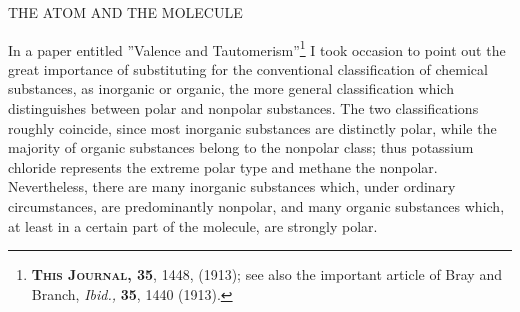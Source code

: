 \documentclass[11pt]{memoir}
\begin{document}
\setlength{\aboverulesep}{0pt} %
\setlength{\belowrulesep}{0pt}
  
\titleformat{\section}{\normalfont\Large\scshape\centering}{\thesection}{}{}
\titleformat{\subsection}{\normalfont\bfseries}{\thesubsection}{}{}



\frontmatter

\mainmatter
{}


\thispagestyle{plain}

\begin{center}
	{\LARGE THE ATOM AND THE MOLECULE}
\end{center}


 
In a paper entitled ''Valence and Tautomerism''\footnote{\textbf{\textsc{This Journal}, 35}, 1448, (1913); see also the important article of Bray and Branch, \emph{Ibid.,} \textbf{35}, 1440 (1913).} I took occasion to point out the great importance of substituting for the conventional classification of chemical substances, as inorganic or organic, the more general classification which distinguishes between polar and nonpolar substances.  The two classifications roughly coincide, since most inorganic substances are distinctly polar, while the majority of organic substances belong to the nonpolar class; thus potassium chloride represents the extreme polar type and methane the nonpolar.  Nevertheless, there are many inorganic substances which, under ordinary circumstances, are predominantly nonpolar, and many organic substances which, at least in a certain part of the molecule, are strongly polar.
\end{document}
